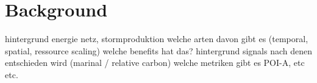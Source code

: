 \chapter{Background}

hintergrund energie netz, stormproduktion
welche arten davon gibt es (temporal, spatial, ressource scaling)
welche benefits hat das?
hintergrund signals nach denen entschieden wird (marinal / relative carbon)
welche metriken gibt es POI-A, etc etc.

